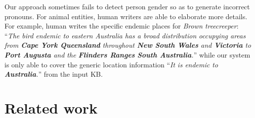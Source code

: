 \documentclass[11pt,a4paper]{article}
\begin{document}
Our approach sometimes fails to detect person gender so as to generate incorrect pronouns. 
For animal entities, human writers are able to elaborate more details. For example, human writes the specific endemic places for \emph{Brown treecreeper}: ``\emph{The bird endemic to eastern Australia has a broad distribution occupying areas from \textbf{Cape York Queensland} throughout \textbf{New South Wales} and \textbf{Victoria} to \textbf{Port Augusta} and the \textbf{Flinders Ranges} \textbf{South Australia}.}'' while our system is only able to cover the generic location information ``\emph{It is endemic to \textbf{Australia}.}'' from the input KB.






























































 















 \section{Related work}
\end{document}
